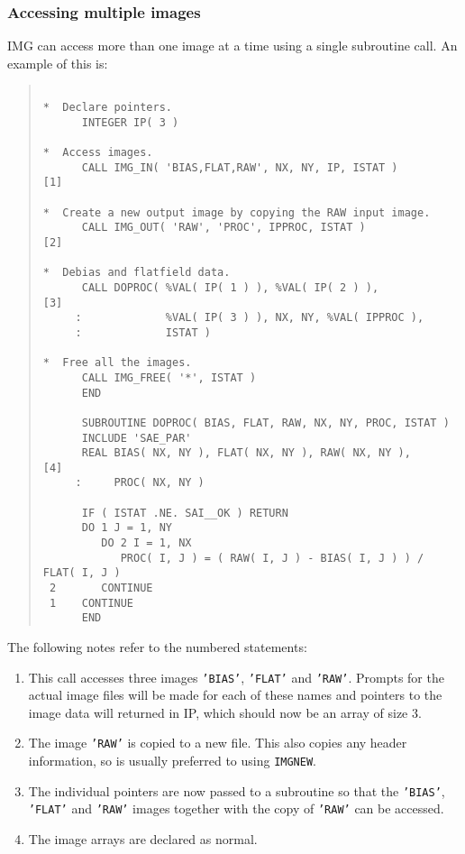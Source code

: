 \documentclass[twoside,11pt]{article}
\newcommand{\htmlref}[2]{#1}
\renewcommand{\_}{\texttt{\symbol{95}}}
\newcommand{\myverb}[1]{{\texttt{#1}}}
\newcommand{\mynote}{The following notes refer to the numbered statements:}
\newenvironment{code}{\begin{small} \begin{quote}}
                     {\end{quote} \end{small}}
\newenvironment{enumnotes}
{
   \renewcommand{\labelenumi}{\myverb{[\theenumi]}}
   \begin{enumerate}
}{
   \end{enumerate}
   \renewcommand{\labelenumi}{\theenumi}
}
\renewenvironment{enumnotes}
  {
    \begin{enumerate}
  }{
    \end{enumerate}
  }
\begin{document}
\subsubsection{Accessing multiple images}
IMG can access more than one image at a time using a single subroutine
call. An example of this is:
\begin{code}
\begin{verbatim}

*  Declare pointers.
      INTEGER IP( 3 )

*  Access images.
      CALL IMG_IN( 'BIAS,FLAT,RAW', NX, NY, IP, ISTAT )       [1]

*  Create a new output image by copying the RAW input image.
      CALL IMG_OUT( 'RAW', 'PROC', IPPROC, ISTAT )            [2]

*  Debias and flatfield data.
      CALL DOPROC( %VAL( IP( 1 ) ), %VAL( IP( 2 ) ),          [3]
     :             %VAL( IP( 3 ) ), NX, NY, %VAL( IPPROC ),
     :             ISTAT )

*  Free all the images.
      CALL IMG_FREE( '*', ISTAT )
      END

      SUBROUTINE DOPROC( BIAS, FLAT, RAW, NX, NY, PROC, ISTAT )
      INCLUDE 'SAE_PAR'
      REAL BIAS( NX, NY ), FLAT( NX, NY ), RAW( NX, NY ),     [4]
     :     PROC( NX, NY )

      IF ( ISTAT .NE. SAI__OK ) RETURN
      DO 1 J = 1, NY
         DO 2 I = 1, NX
            PROC( I, J ) = ( RAW( I, J ) - BIAS( I, J ) ) / FLAT( I, J )
 2       CONTINUE
 1    CONTINUE
      END
\end{verbatim}
\end{code}
\mynote
\begin{enumnotes}
\item
This call accesses three images \myverb{'BIAS'}, \myverb{'FLAT'} and
\myverb{'RAW'}. Prompts for the actual image files will be made for
each of these names and pointers to the image data will returned in IP,
which should now be an array of size 3.

\item
The image \myverb{'RAW'} is copied to a new file. This also copies any
header information, so is usually preferred to using \htmlref{\myverb{IMG\_NEW}}{IMG_NEWnx}.

\item
The individual pointers are now passed to a subroutine so that the
\myverb{'BIAS'}, \myverb{'FLAT'} and \myverb{'RAW'} images together
with the copy of \myverb{'RAW'} can be accessed.

\item
The image arrays are declared as normal.
\end{enumnotes}
\end{document}
